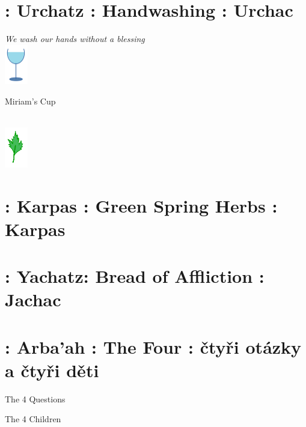 \documentclass[a5paper,10pt]{memoir}
\begin{document}
\section{ : Urchatz : Handwashing : Urchac}
{{\color{midblue} \textit{We wash our hands without a blessing}}\\
	\urchatz}
\vspace*{2ex}
\vspace*{2ex}
\hfill\includegraphics[width=10mm]{Miriam}
\vspace*{-10ex}  %
\begin{center}
	\noindent \large \color{midblue} Miriam's Cup
\end{center}
\Miriam \\
% 
\vspace*{-3ex}
\hfill\includegraphics[width=10mm]{Karpas}
\vspace*{-12ex}  %
\section{ : Karpas : Green Spring Herbs : Karpas}
 \Karpas
\vspace*{1ex}
\section{ : Yachatz: Bread of Affliction : Jachac}
\Yachatz
\vspace*{2ex}
\section{ : Arba'ah : The Four : čtyři otázky a čtyři děti}
\begin{center}
	\noindent \large \color{midblue} The 4 Questions
\end{center}
\MaNishtana
\begin{center}
	\noindent \large \color{midblue} The 4 Children
\end{center}
\ArbaAh
%
\vspace*{2ex}
\end{document}
